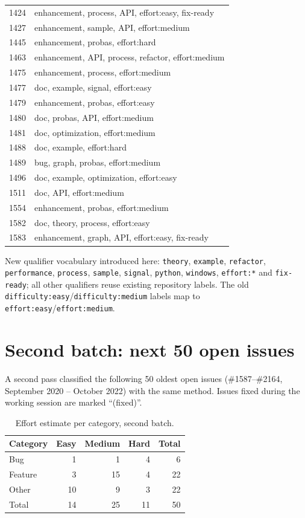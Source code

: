 \documentclass[a4paper,11pt]{article}
\begin{document}
\begin{longtable}{rp{10.8cm}}
1424 & enhancement, process, API, effort:easy, fix-ready \\
1427 & enhancement, sample, API, effort:medium \\
1445 & enhancement, probas, effort:hard \\
1463 & enhancement, API, process, refactor, effort:medium \\
1475 & enhancement, process, effort:medium \\
1477 & doc, example, signal, effort:easy \\
1479 & enhancement, probas, effort:easy \\
1480 & doc, probas, API, effort:medium \\
1481 & doc, optimization, effort:medium \\
1488 & doc, example, effort:hard \\
1489 & bug, graph, probas, effort:medium \\
1496 & doc, example, optimization, effort:easy \\
1511 & doc, API, effort:medium \\
1554 & enhancement, probas, effort:medium \\
1582 & doc, theory, process, effort:easy \\
1583 & enhancement, graph, API, effort:easy, fix-ready \\
\bottomrule
\end{longtable}
\normalsize

New qualifier vocabulary introduced here: \texttt{theory},
\texttt{example}, \texttt{refactor}, \texttt{performance},
\texttt{process}, \texttt{sample}, \texttt{signal}, \texttt{python},
\texttt{windows}, \texttt{effort:*} and \texttt{fix-ready}; all other
qualifiers reuse existing repository labels. The old
\texttt{difficulty:easy}/\texttt{difficulty:medium} labels map to
\texttt{effort:easy}/\texttt{effort:medium}.


\section{Second batch: next 50 open issues}

A second pass classified the following 50 oldest open issues
(\#1587--\#2164, September 2020 -- October 2022) with the same method.
Issues fixed during the working session are marked ``(fixed)''.

\begin{table}[h]
\centering
\caption{Effort estimate per category, second batch.}
\begin{tabular}{lrrrr}
\toprule
Category & Easy & Medium & Hard & Total \\
\midrule
Bug & 1 & 1 & 4 & 6 \\
Feature & 3 & 15 & 4 & 22 \\
Other & 10 & 9 & 3 & 22 \\
Total & 14 & 25 & 11 & 50 \\
\bottomrule
\end{tabular}
\end{table}
\end{document}
